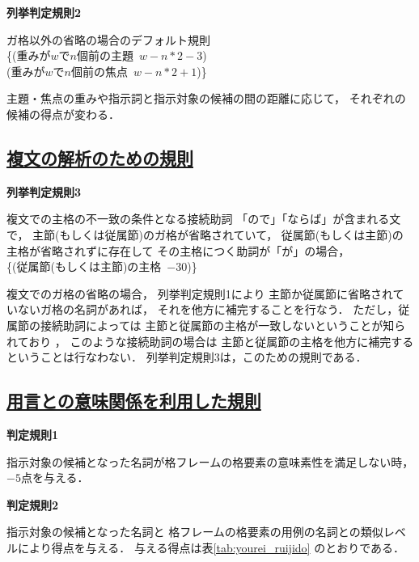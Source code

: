 \newpage
\vspace{0.5cm}
\noindent
{\bf 列挙判定規則2}
\begin{indention}{0.8cm}\noindent
  ガ格以外の省略の場合のデフォルト規則\\
  \{(重みが$w$で$n$個前の主題 \,$w-n*2-3$)\\
  (重みが$w$で$n$個前の焦点 \,$w-n*2+1$)\}
\end{indention}
\vspace{0.5cm}

主題・焦点の重みや指示詞と指示対象の候補の間の距離に応じて，
それぞれの候補の得点が変わる．

\subsection*{\underline{複文の解析のための規則}}


\noindent
{\bf 列挙判定規則3}
\begin{indention}{0.8cm}\noindent
  複文での主格の不一致の条件となる接続助詞
  「ので」「ならば」が含まれる文で，
  主節(もしくは従属節)のガ格が省略されていて，
  従属節(もしくは主節)の主格が省略されずに存在して
  その主格につく助詞が「が」の場合，\\
  \{(従属節(もしくは主節)の主格 \,$-30$)\}
\end{indention}
\vspace{0.5cm}

複文でのガ格の省略の場合，
列挙判定規則1により
主節か従属節に省略されていないガ格の名詞があれば，
それを他方に補完することを行なう．
ただし，従属節の接続助詞によっては
主節と従属節の主格が一致しないということが知られており
\cite{minami}\cite{yoshimoto}\cite{hirai}\cite{nakaiwa}，
このような接続助詞の場合は
主節と従属節の主格を他方に補完するということは行なわない．
列挙判定規則3は，このための規則である．

\subsection*{\underline{用言との意味関係を利用した規則}}


\noindent
{\bf 判定規則1}
\begin{indention}{0.8cm}\noindent
  指示対象の候補となった名詞が格フレームの格要素の意味素性を満足しない時，
  $-5$点を与える．
\end{indention}

\vspace{0.5cm}
\noindent
{\bf 判定規則2}
\begin{indention}{0.8cm}\noindent
  指示対象の候補となった名詞と
  格フレームの格要素の用例の名詞との類似レベルにより得点を与える．
  与える得点は{表\ref{tab:yourei_ruijido}} のとおりである．
\end{indention}

